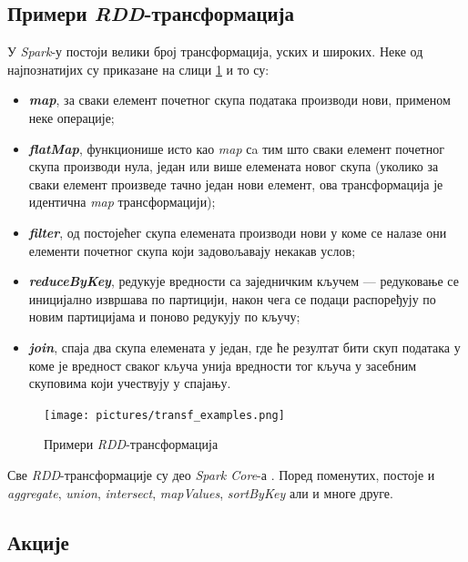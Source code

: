 \documentclass[12pt,oneside]{memoir}
\begin{document}
\subsection{Примери \textit{RDD}-трансформација}
\label{subsec:spark_transformation_types}

У \textit{Spark}-у постоји велики број трансформација, уских и широких. Неке од најпознатијих су приказане на слици \ref{fig:sprk_trnsf_examples} и то су:

\begin{itemize}
	\item \textbf{\textit{map}}, за сваки елемент почетног скупа података производи нови, применом неке операције;
	\item \textbf{\textit{flatMap}}, функционише исто као \textit{map} сa тим што сваки елемент почетног скупа производи нула, један или више елемената новог скупа (уколико за сваки елемент произведе тачно један нови елемент, ова трансформација је идентична \textit{map} трансформацији);
	\item \textbf{\textit{filter}}, од постојећег скупа елемената производи нови у коме се налазе они елементи почетног скупа који задовољавају некакав услов;
	\item \textbf{\textit{reduceByKey}}, редукује вредности са заједничким кључем --- редуковање се иницијално извршава по партицији, након чега се подаци распоређују по новим партицијама и поново редукују по кључу;
	\item \textbf{\textit{join}}, спаја два скупа елемената у један, где ће резултат бити скуп података у коме је вредност сваког кључа унија вредности тог кључа у засебним скуповима који учествују у спајању.
\end{itemize}

\begin{figure}[!ht]
  \centering
  \texttt{[image: pictures/transf\_examples.png]}
  \caption{Примери \textit{RDD}-трансформација}
  \label{fig:sprk_trnsf_examples}
\end{figure}

Све \textit{RDD}-трансформације су део \textit{Spark Core}-а \cite{spark_rdd_transf}. Поред поменутих, постоје и \textit{aggregate}, \textit{union}, \textit{intersect}, \textit{mapValues}, \textit{sortByKey} али и многе друге.

\subsection{Акције}
\label{subsec:spark_akc}
\end{document}
